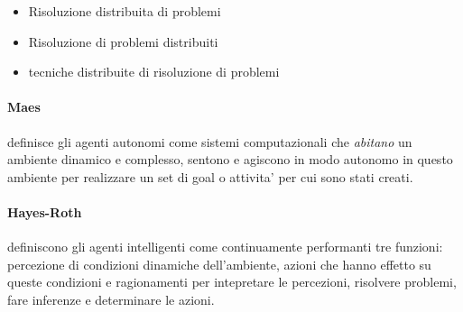 \begin{itemize}
  \item Risoluzione distribuita di problemi
  \item Risoluzione di problemi distribuiti
  \item tecniche distribuite di risoluzione di problemi
\end{itemize}

\paragraph{Maes} definisce gli agenti autonomi come sistemi computazionali che \textit{abitano} un ambiente dinamico e complesso, sentono e agiscono in modo autonomo in questo ambiente per realizzare un set di goal o attivita' per cui sono stati creati.
\paragraph{Hayes-Roth} definiscono gli agenti intelligenti come continuamente performanti tre funzioni: percezione di condizioni dinamiche dell'ambiente, azioni che hanno effetto su queste condizioni e ragionamenti per intepretare le percezioni, risolvere problemi, fare inferenze e determinare le azioni.

